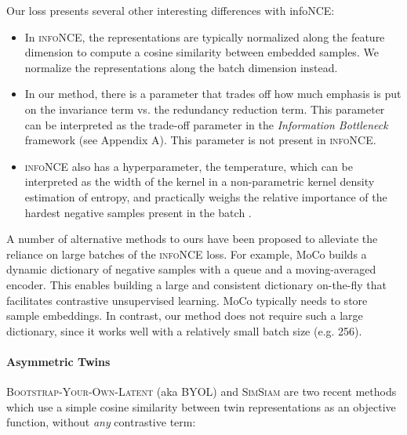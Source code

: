 \documentclass{article}
\begin{document}
Our loss presents several other interesting differences with infoNCE:
\begin{itemize}
\item In \textsc{infoNCE}, the representations are typically normalized along the feature dimension to compute a cosine similarity between embedded samples. We normalize the representations along the batch dimension instead.

\item In our method, there is a parameter  that trades off how much emphasis is put on the invariance term vs. the redundancy reduction term. This parameter can be interpreted as the trade-off parameter in the \emph{Information Bottleneck} framework (see Appendix A). This parameter is not present in \textsc{infoNCE}. 

\item \textsc{infoNCE} also has a hyperparameter, the temperature, which can be interpreted as the width of the kernel in a non-parametric kernel density estimation of entropy, and practically weighs the relative importance of the hardest negative samples present in the batch \cite{chen2020simple}.
\end{itemize}

A number of alternative methods to ours have been proposed to alleviate the reliance on large batches of the \textsc{infoNCE} loss. For example, MoCo \cite{he2019momentum, chen2020improved} builds a dynamic dictionary of negative samples with a queue and a moving-averaged encoder. This enables building a large and consistent dictionary on-the-fly that facilitates contrastive unsupervised learning. MoCo typically needs to store  sample embeddings. In contrast, our method does not require such a large dictionary, since it works well with a relatively small batch size (e.g. 256).



\paragraph{Asymmetric Twins}

\textsc{Bootstrap-Your-Own-Latent} (aka \textsc{BYOL}) \cite{grill2020bootstrap} and \textsc{SimSiam} \cite{chen2020exploring} are two recent methods which use a simple cosine similarity between twin representations as an objective function, without \emph{any} contrastive term:
\end{document}
